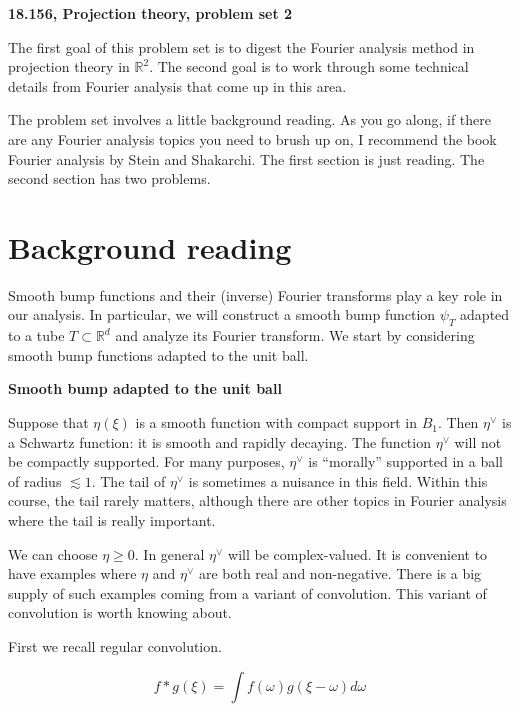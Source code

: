 \documentclass{amsart}
\newcommand{\RR}{\mathbb{R}}
\begin{document}
{\bf  18.156, Projection theory,  problem set 2}

\vskip10pt

The first goal of this problem set is to digest the Fourier analysis method in projection theory in $\RR^2$.   The second goal is to work through some technical details from Fourier analysis that come up in this area.

\vskip10pt

The problem set involves a little background reading.   As you go along,  if there are any Fourier analysis topics you need to brush up on,  I recommend the book Fourier analysis by Stein and Shakarchi.  The first section is just reading.  The second section has two problems.

\section{Background reading}

Smooth bump functions and their (inverse) Fourier transforms play a key role in our analysis.  In particular,  we will construct a smooth bump function $\psi_T$ adapted to a tube $T \subset \RR^d$ and analyze its Fourier transform.   We start by considering smooth bump functions adapted to the unit ball.

\vskip10pt

{\bf Smooth bump adapted to the unit ball}

\vskip10pt

Suppose that $\eta(\xi)$ is a smooth function with compact support in $B_1$.   Then $ \eta^\vee$ is a Schwartz function: it is smooth and rapidly decaying.  The function $ \eta^\vee$ will not be compactly supported.   For many purposes,  $\eta^\vee$ is ``morally'' supported in a ball of radius $\lesssim 1$.   The tail of $\eta^\vee$ is sometimes a nuisance in this field.   Within this course,  the tail rarely matters,  although there are other topics in Fourier analysis where the tail is really important.

We can choose $\eta \ge 0$.   In general $\eta^\vee$ will be complex-valued.   It is convenient to have examples where $\eta$ and $\eta^\vee$ are both real and non-negative.   There is a big supply of such examples coming from a variant of convolution.   This variant of convolution is worth knowing about.

First we recall regular convolution.

\begin{equation} \label{defconv}
f * g(\xi) = \int f(\omega) g(\xi - \omega) d \omega
\end{equation}
\end{document}
